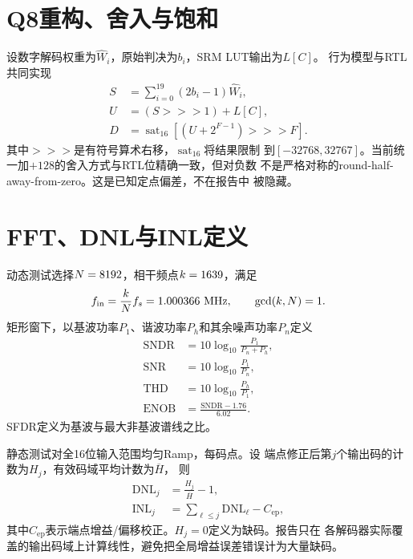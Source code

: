 \documentclass[11pt,a4paper,UTF8,fontset=none,openany]{ctexrep}
\numberwithin{equation}{chapter}
\numberwithin{figure}{chapter}
\numberwithin{table}{chapter}
\begin{document}
\section{Q8重构、舍入与饱和}

设数字解码权重为$\widehat W_i$，原始判决为$b_i$，SRM LUT输出为$L[C]$。
行为模型与RTL共同实现
\begin{align}
  S &= \sum_{i=0}^{19}(2b_i-1)\widehat W_i,
  \label{eq:weighted-sum}\\
  U &= (S\mathbin{\mathrm{>>>}}1)+L[C],
  \label{eq:normalized-sum}\\
  D &= \operatorname{sat}_{16}
  \left[
    \left(U+2^{F-1}\right)\mathbin{\mathrm{>>>}}F
  \right].
  \label{eq:final-decode}
\end{align}
其中$\mathrm{>>>}$是有符号算术右移，$\operatorname{sat}_{16}$将结果限制
到$[-32768,32767]$。当前统一加$+128$的舍入方式与RTL位精确一致，但对负数
不是严格对称的round-half-away-from-zero。这是已知定点偏差，不在报告中
被隐藏。

\section{FFT、DNL与INL定义}

动态测试选择$N=8192$，相干频点$k=1639$，满足
\begin{equation}
  f_{\mathrm{in}}=\frac{k}{N}f_s
  =1.000366\ \mathrm{MHz},
  \qquad \gcd(k,N)=1.
  \label{eq:coherent-frequency}
\end{equation}
矩形窗下，以基波功率$P_1$、谐波功率$P_h$和其余噪声功率$P_n$定义
\begin{align}
  \mathrm{SNDR}&=10\log_{10}\frac{P_1}{P_n+P_h},
  \label{eq:sndr}\\
  \mathrm{SNR}&=10\log_{10}\frac{P_1}{P_n},
  \label{eq:snr}\\
  \mathrm{THD}&=10\log_{10}\frac{P_h}{P_1},
  \label{eq:thd}\\
  \mathrm{ENOB}&=\frac{\mathrm{SNDR}-1.76}{6.02}.
  \label{eq:enob}
\end{align}
SFDR定义为基波与最大非基波谱线之比。

静态测试对全16位输入范围均匀Ramp，每码\StaticSamplesPerCode 点。设
端点修正后第$j$个输出码的计数为$H_j$，有效码域平均计数为$\overline H$，
则
\begin{align}
  \mathrm{DNL}_j &= \frac{H_j}{\overline H}-1,
  \label{eq:dnl}\\
  \mathrm{INL}_j &= \sum_{\ell\le j}\mathrm{DNL}_\ell-C_{\mathrm{ep}},
  \label{eq:inl}
\end{align}
其中$C_{\mathrm{ep}}$表示端点增益/偏移校正。$H_j=0$定义为缺码。报告只在
各解码器实际覆盖的输出码域上计算线性，避免把全局增益误差错误计为大量缺码。
\end{document}
